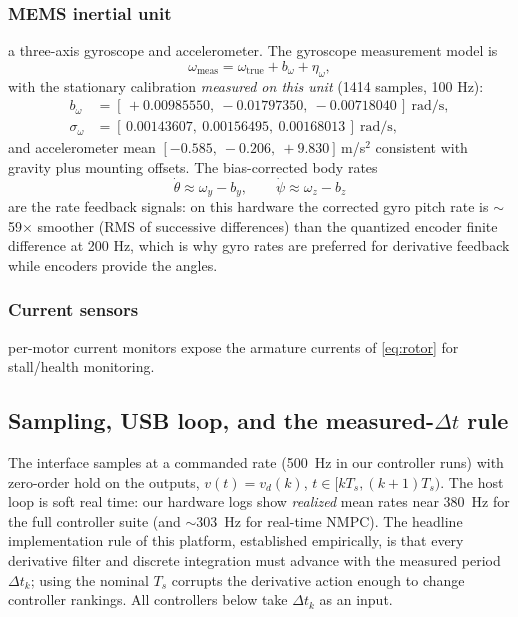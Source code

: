 \documentclass[conference]{IEEEtran}
\begin{document}
\subsubsection{MEMS inertial unit} a three-axis gyroscope and accelerometer. The gyroscope measurement model is
\begin{equation}
\omega_{\mathrm{meas}} = \omega_{\mathrm{true}} + b_\omega + \eta_\omega,
\end{equation}
with the stationary calibration \emph{measured on this unit} (1414 samples, 100 Hz):
\begin{align}
b_\omega &= [\,+0.00985550,\ -0.01797350,\ -0.00718040\,]\ \mathrm{rad/s},\nonumber\\
\sigma_\omega &= [\,0.00143607,\ 0.00156495,\ 0.00168013\,]\ \mathrm{rad/s},
\label{eq:imu}
\end{align}
and accelerometer mean $[-0.585,\ -0.206,\ +9.830]\,$m/s$^2$ consistent with gravity plus mounting offsets. The bias-corrected body rates
\begin{equation}
\dot\theta \approx \omega_y - b_y,\qquad \dot\psi \approx \omega_z - b_z
\end{equation}
are the rate feedback signals: on this hardware the corrected gyro pitch rate is $\sim$59$\times$ smoother (RMS of successive differences) than the quantized encoder finite difference at 200 Hz, which is why gyro rates are preferred for derivative feedback while encoders provide the angles.
\subsubsection{Current sensors} per-motor current monitors expose the armature currents of \eqref{eq:rotor} for stall/health monitoring.

\subsection{Sampling, USB loop, and the measured-$\Delta t$ rule}
The interface samples at a commanded rate (500~Hz in our controller runs) with zero-order hold on the outputs, $v(t) = v_d(k)$, $t\in[kT_s,(k{+}1)T_s)$. The host loop is soft real time: our hardware logs show \emph{realized} mean rates near $380$~Hz for the full controller suite (and $\sim$303~Hz for real-time NMPC). The headline implementation rule of this platform, established empirically, is that every derivative filter and discrete integration must advance with the measured period $\Delta t_k$; using the nominal $T_s$ corrupts the derivative action enough to change controller rankings. All controllers below take $\Delta t_k$ as an input.
\end{document}

